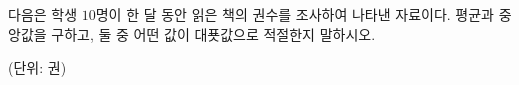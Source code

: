 다음은 학생 $10$명이 한 달 동안 읽은 책의 권수를 조사하여 나타낸 자료이다. 평균과 중앙값을 구하고, 둘 중 어떤 값이 대푯값으로 적절한지 말하시오.\par{\raggedleft\small (단위: 권)\par}
